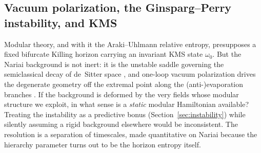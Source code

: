 \documentclass[11pt]{article}
\newcommand{\Nariai}{Nariai}
\begin{document}
\subsection{Vacuum polarization, the Ginsparg--Perry instability, and KMS}
\label{sec:timescales}

Modular theory, and with it the Araki--Uhlmann relative entropy, presupposes a fixed bifurcate Killing horizon carrying an invariant KMS state $\omega_0$. But the \Nariai{} background is not inert: it is the unstable saddle governing the semiclassical decay of de~Sitter space \cite{GinspargPerry}, and one-loop vacuum polarization drives the degenerate geometry off the extremal point along the (anti-)evaporation branches \cite{BoussoHawking}. If the background is deformed by the very fields whose modular structure we exploit, in what sense is a \emph{static} modular Hamiltonian available? Treating the instability as a predictive bonus (Section~\ref{sec:instability}) while silently assuming a rigid background elsewhere would be inconsistent. The resolution is a separation of timescales, made quantitative on \Nariai{} because the hierarchy parameter turns out to be the horizon entropy itself.
\end{document}
